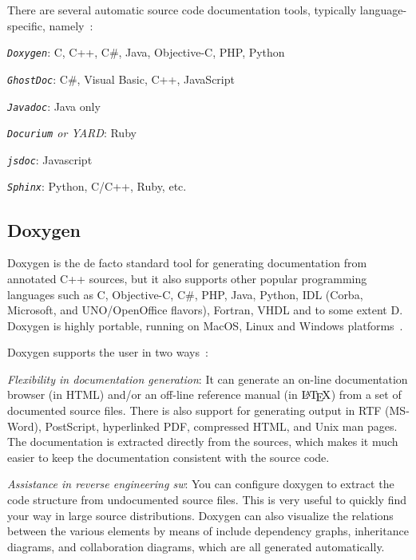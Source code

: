 There are several automatic source code documentation tools, typically
language-specific, namely~\cite{sourceCodeDocBestPractices}:
\begin{item-c}
\item \emph{\texttt{Doxygen}}: C, C++, C\#, Java, Objective-C, PHP, Python
\item \emph{\texttt{GhostDoc}}: C\#, Visual Basic, C++, JavaScript
\item \emph{\texttt{Javadoc}}: Java only
\item \emph{\texttt{Docurium} or \emph{YARD}}: Ruby
\item \emph{\texttt{jsdoc}}: Javascript
\item \emph{\texttt{Sphinx}}: Python, C/C++, Ruby, etc.
\end{item-c}

\subsection{Doxygen}
\label{sec:doxygen}
Doxygen is the de facto standard tool for generating documentation from
annotated C++ sources, but it also supports other popular programming languages
such as C, Objective-C, C\#, PHP, Java, Python, IDL (Corba, Microsoft, and
UNO/OpenOffice flavors), Fortran, VHDL and to some extent D.
Doxygen is highly portable, running on MacOS, Linux and Windows platforms~\cite{doxygenIndex}.

Doxygen supports the user in two ways~\cite{doxygenIndex}:
\begin{enum-c}
\item \emph{Flexibility in documentation generation}:
  It can generate an on-line documentation browser (in HTML) and/or an
  off-line reference manual (in $\mbox{\LaTeX}$) from a set of documented source
  files. There is also support for generating output in RTF (MS-Word),
  PostScript, hyperlinked PDF, compressed HTML, and Unix man pages. The
  documentation is extracted directly from the sources, which makes it much
  easier to keep the documentation consistent with the source code.
\item \emph{Assistance in reverse engineering \gls{sw}}:
  You can configure doxygen to extract the code structure from undocumented
  source files. This is very useful to quickly find your way in large source
  distributions. Doxygen can also visualize the relations between the various
  elements by means of include dependency graphs, inheritance diagrams, and
  collaboration diagrams, which are all generated automatically.
\end{enum-c}

